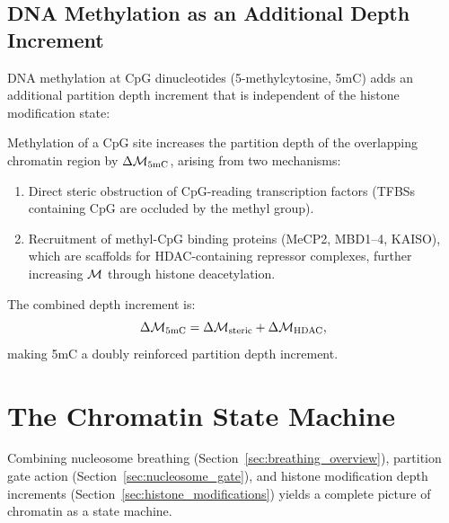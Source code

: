 \subsection{DNA Methylation as an Additional Depth Increment}
\label{subsec:dna_methylation}

DNA methylation at CpG dinucleotides (5-methylcytosine, 5mC) adds an
additional partition depth increment that is independent of the histone
modification state:

\begin{proposition}
\label{prop:5mc_depth}
Methylation of a CpG site increases the partition depth of the overlapping
chromatin region by $\Delta\mathcal{M}_{\mathrm{5mC}}$, arising from two mechanisms:
\begin{enumerate}[label=(\roman*)]
  \item Direct steric obstruction of CpG-reading transcription factors (TFBSs
        containing CpG are occluded by the methyl group).
  \item Recruitment of methyl-CpG binding proteins (MeCP2, MBD1--4, KAISO),
        which are scaffolds for HDAC-containing repressor complexes, further
        increasing $\mathcal{M}$ through histone deacetylation.
\end{enumerate}
The combined depth increment is:
\begin{equation}
  \Delta\mathcal{M}_{\mathrm{5mC}} = \Delta\mathcal{M}_{\mathrm{steric}}
  + \Delta\mathcal{M}_{\mathrm{HDAC}},
  \label{eq:methylation_depth}
\end{equation}
making 5mC a doubly reinforced partition depth increment.
\end{proposition}

\section{The Chromatin State Machine}
\label{sec:chromatin_state_machine}

Combining nucleosome breathing (Section~\ref{sec:breathing_overview}),
partition gate action (Section~\ref{sec:nucleosome_gate}), and histone
modification depth increments (Section~\ref{sec:histone_modifications})
yields a complete picture of chromatin as a state machine.

